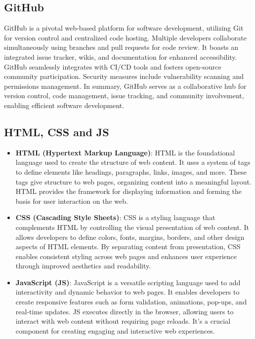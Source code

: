 \subsection{GitHub}
GitHub is a pivotal web-based platform for software development, utilizing Git for version control and centralized code hosting. Multiple developers collaborate simultaneously using branches and pull requests for code review. It boasts an integrated issue tracker, wikis, and documentation for enhanced accessibility. GitHub seamlessly integrates with CI/CD tools and fosters open-source community participation. Security measures include vulnerability scanning and permissions management. In summary, GitHub serves as a collaborative hub for version control, code management, issue tracking, and community involvement, enabling efficient software development.
\subsection{HTML, CSS and JS}
\begin{itemize}
    \item \textbf{HTML (Hypertext Markup Language)}: HTML is the foundational language used to create the structure of web content. It uses a system of tags to define elements like headings, paragraphs, links, images, and more. These tags give structure to web pages, organizing content into a meaningful layout. HTML provides the framework for displaying information and forming the basis for user interaction on the web.

    \item \textbf{CSS (Cascading Style Sheets)}: CSS is a styling language that complements HTML by controlling the visual presentation of web content. It allows developers to define colors, fonts, margins, borders, and other design aspects of HTML elements. By separating content from presentation, CSS enables consistent styling across web pages and enhances user experience through improved aesthetics and readability.

    \item \textbf{JavaScript (JS)}: JavaScript is a versatile scripting language used to add interactivity and dynamic behavior to web pages. It enables developers to create responsive features such as form validation, animations, pop-ups, and real-time updates. JS executes directly in the browser, allowing users to interact with web content without requiring page reloads. It's a crucial component for creating engaging and interactive web experiences.

\end{itemize}
